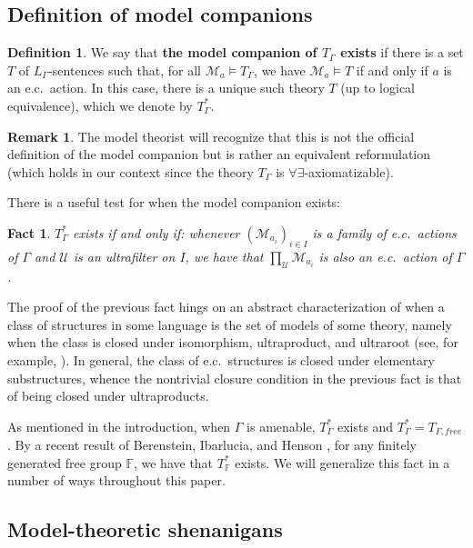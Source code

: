 \documentclass[12pt]{amsart}
\newtheorem{fact}[thm]{Fact}
\theoremstyle{definition}
\newtheorem{defn}[thm]{Definition}
\newtheorem{remark}[thm]{Remark}
\def\bb{\mathbb}
\def\bb{\mathbb}
\def\cal{\mathcal}
\def\u{\mathsf 1}
\def \u{\mathcal U}
\begin{document}
\subsection{Definition of model companions}\label{modcompsubsection}

\begin{defn}
We say that \textbf{the model companion of $T_\Gamma$ exists} if there is a set $T$ of $L_\Gamma$-sentences such that, for all $\cal M_a\models T_\Gamma$, we have $\cal M_a\models T$ if and only if $a$ is an e.c.\ action.  In this case, there is a unique such theory $T$ (up to logical equivalence), which we denote by $T_\Gamma^*$.
\end{defn}

\begin{remark}
The model theorist will recognize that this is not the official definition of the model companion but is rather an equivalent reformulation (which holds in our context since the theory $T_\Gamma$ is $\forall\exists$-axiomatizable).
\end{remark}

There is a useful test for when the model companion exists:  

\begin{fact}
$T_\Gamma^*$ exists if and only if:  whenever $(\cal M_{a_i})_{i\in I}$ is a family of e.c.\ actions of $\Gamma$ and $\u$ is an ultrafilter on $I$, we have that $\prod_\u \cal M_{a_i}$ is also an e.c.\ action of $\Gamma$.
\end{fact}

The proof of the previous fact hings on an abstract characterization of when a class of structures in some language is the set of models of some theory, namely when the class is closed under isomorphism, ultraproduct, and ultraroot (see, for example, \cite[Proposition 5.14]{bbhu}).  In general, the class of e.c.\ structures is closed under elementary substructures, whence the nontrivial closure condition in the previous fact is that of being closed under ultraproducts.

As mentioned in the introduction, when $\Gamma$ is amenable, $T_\Gamma^*$ exists and $T_\Gamma^*=T_{\Gamma,free}$.  By a recent result of Berenstein, Ibarlucia, and Henson \cite{BIH}, for any finitely generated free group $\bb F$, we have that $T_{\bb F}^*$ exists.  We will generalize this fact in a number of ways throughout this paper.

\subsection{Model-theoretic shenanigans}
\end{document}
